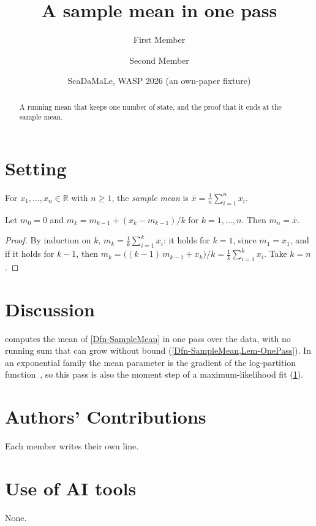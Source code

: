 

\newcommand{\Mean}{\bar{x}}

\title{A sample mean in one pass}
\author{First Member \and Second Member}
\date{ScaDaMaLe, WASP 2026 \quad (an own-paper fixture)}


\maketitle

\begin{abstract}
A running mean that keeps one number of state, and the proof that it ends at the sample mean.
\end{abstract}

\section{Setting}\label{sec-setting}

\begin{definition}\label{Dfn-SampleMean}
For $x_1,\dots,x_n \in \mathbb{R}$ with $n \ge 1$, the \emph{sample mean} is
$\Mean = \frac{1}{n} \sum_{i=1}^{n} x_i$.
\end{definition}

\begin{lemma}\label{Lem-OnePass}
Let $m_0 = 0$ and $m_k = m_{k-1} + (x_k - m_{k-1})/k$ for $k = 1,\dots,n$. Then $m_n = \Mean$.
\end{lemma}

\begin{proof}
By induction on $k$, $m_k = \frac{1}{k} \sum_{i=1}^{k} x_i$: it holds for $k = 1$, since $m_1 = x_1$, and if it holds
for $k - 1$, then $m_k = \bigl((k-1)\, m_{k-1} + x_k\bigr)/k = \frac{1}{k} \sum_{i=1}^{k} x_i$. Take $k = n$.
\end{proof}

\section{Discussion}\label{sec-discussion}

 computes the mean of \cref{Dfn-SampleMean} in one pass over the data, with no running sum that
can grow without bound (\cref{Dfn-SampleMean,Lem-OnePass}). In an exponential family the mean parameter is the
gradient of the log-partition function~\cite[Prop.~3.1]{wainwright2008graphical}, so this pass is also the moment
step of a maximum-likelihood fit (\cref{sec-setting}).

\section*{Authors' Contributions}

Each member writes their own line.

\section*{Use of AI tools}

None.






